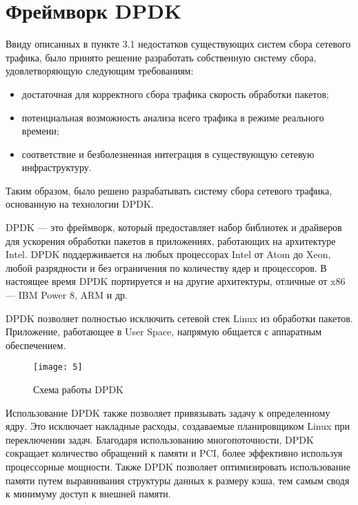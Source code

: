 \section{Фреймворк DPDK}

Ввиду описанных в пункте 3.1 недостатков существующих систем сбора сетевого трафика, было принято решение разработать собственную систему сбора, удовлетворяющую следующим требованиям:
\begin{itemize}
\item достаточная для корректного сбора трафика скорость обработки пакетов;
\item потенциальная возможность анализа всего трафика в режиме реального времени;
\item соответствие и безболезненная интеграция в существующую сетевую инфраструктуру.
\end{itemize}

Таким образом, было решено разрабатывать систему сбора сетевого трафика, основанную на технологии DPDK.\par 

DPDK --- это фреймворк, который предоставляет набор библиотек и драйверов для ускорения обработки пакетов в приложениях, работающих на архитектуре Intel. DPDK поддерживается на любых процессорах Intel от Atom до Xeon, любой разрядности и без ограничения по количеству ядер и процессоров. В настоящее время DPDK портируется и на другие архитектуры, отличные от x86 --- IBM Power 8, ARM и др.\par 

DPDK позволяет полностью исключить сетевой стек Linux из обработки пакетов. Приложение, работающее в User Space, напрямую общается с аппаратным обеспечением.\par 

\begin{figure}[h!]
    \centering
    \texttt{[image: 5]}
    \caption{Схема работы DPDK}
    \label{img:5}
\end{figure} 

Использование DPDK также позволяет привязывать задачу к определенному ядру. Это исключает накладные расходы, создаваемые планировщиком Linux при переключении задач. Благодаря использованию многопоточности, DPDK сокращает количество обращений к памяти и PCI, более эффективно используя процессорные мощности. Также DPDK позволяет оптимизировать использование памяти путем выравнивания структуры данных к размеру кэша, тем самым сводя к минимуму доступ к внешней памяти.\par

